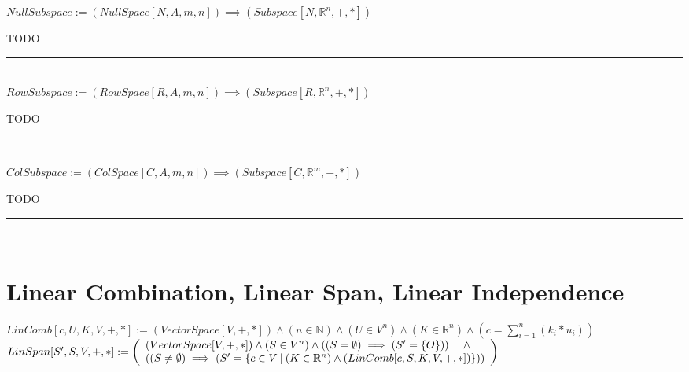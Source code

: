 \documentclass{book}
\newcommand{\abr}{:=}
\newcommand{\st}{\mathbin{|}}
\begin{document}
$NullSubspace \abr (NullSpace[N, A, m, n]) \implies (Subspace[N, \mathbb{R}^n, +, *])$
\begin{enumerate}
  \lit TODO
\end{enumerate} \vspace{.75mm} \hrule \vspace{.75mm} \ \\ 

$RowSubspace \abr (RowSpace[R, A, m, n]) \implies (Subspace[R, \mathbb{R}^n, +, *])$
\begin{enumerate}
  \lit TODO
\end{enumerate} \vspace{.75mm} \hrule \vspace{.75mm} \ \\ 

$ColSubspace \abr (ColSpace[C, A, m, n]) \implies (Subspace[C, \mathbb{R}^m, +, *])$
\begin{enumerate}
  \lit TODO
\end{enumerate} \vspace{.75mm} \hrule \vspace{.75mm} \ \\


\section{Linear Combination, Linear Span, Linear Independence}
$LinComb[c, U, K, V, +, *] \abr (VectorSpace[V, +, *]) \land (n \in \mathbb{N}) \land (U \in V^n) \land (K \in \mathbb{R}^n) \land (c = \sum_{i = 1}^{n}(k_i * u_i))$ \\
$LinSpan[S', S, V, +, *] \abr \left(\begin{array}{ll}
  (VectorSpace[V, +, *]) \land (S \in V^n) \land ((S = \emptyset) \implies (S' = \{O\})) \hfill \land \hfill \\
  ((S \neq \emptyset) \implies (S' = \{c \in V \st (K \in \mathbb{R}^n) \land (LinComb[c, S, K, V, +, *])\}))
\end{array}\right)$ \\
\end{document}
